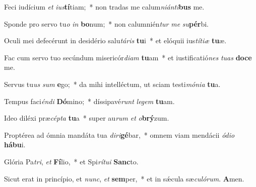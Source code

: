 \item Feci iudícium \textit{et} \textit{ius}\textbf{tí}tiam;~* non tradas me calum\textit{niánti}\textbf{bus} me.

\item Sponde pro servo tu\textit{o} \textit{in} \textbf{bo}num;~* non calumnién\textit{tur} \textit{me} \textit{su}\textbf{pér}bi.

\item Oculi mei defecérunt in desidério salu\textit{táris} \textbf{tu}i~* et elóquii ius\textit{títiæ} \textbf{tu}æ.

\item Fac cum servo tuo secúndum misericór\textit{diam} \textbf{tu}am~* et iustificatió\textit{nes} \textit{tuas} \textbf{do}\textbf{ce} me.

\item Servus tu\textit{us} \textit{sum} \textbf{e}go;~* da mihi intelléctum, ut sciam testi\textit{mónia} \textbf{tu}a.

\item Tempus faci\textit{éndi} \textbf{Dó}mino;~* díssipavé\textit{runt} \textit{legem} \textbf{tu}am.

\item Ideo diléxi præ\textit{cépta} \textbf{tu}a~* super au\textit{rum} \textit{et} \textit{o}\textbf{brý}zum.

\item Proptérea ad ómnia mandáta tua \textit{diri}\textbf{gé}bar,~* omnem viam mendácii \textit{ódio} \textbf{há}\textbf{bu}i.

\item Glória Pa\textit{tri}, \textit{et} \textbf{Fí}lio,~* et Spi\textit{rítui} \textbf{Sanc}to.

\item Sicut erat in princípio, et \textit{nunc}, \textit{et} \textbf{sem}per,~* et in sǽcula sæ\textit{culórum}. \textbf{A}men.
